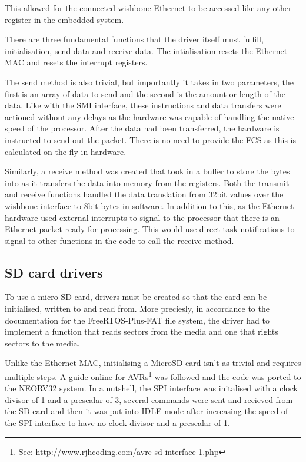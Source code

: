 This allowed for the connected wishbone Ethernet to be accessed like any other register in the embedded system. 


There are three fundamental functions that the driver itself must fulfill, initialisation, send data and receive data. The intialisation resets the Ethernet MAC and resets the interrupt registers. 

The send method is also trivial, but importantly it takes in two parameters, the first is an array of data to send and the second is the amount or length of the data. Like with the SMI interface, these instructions and data transfers were actioned without any delays as the hardware was capable of handling the native speed of the processor. After the data had been transferred, the hardware is instructed to send out the packet. There is no need to provide the FCS as this is calculated on the fly in hardware. 

Similarly, a receive method was created that took in a buffer to store the bytes into as it transfers the data into memory from the registers. Both the transmit and receive functions handled the data translation from 32bit values over the wishbone interface to 8bit bytes in software. In addition to this, as the Ethernet hardware used external interrupts to signal to the processor that there is an Ethernet packet ready for processing. This would use direct task notifications to signal to other functions in the code to call the receive method. 


\subsection{SD card drivers}

To use a micro SD card, drivers must be created so that the card can be initialised, written to and read from. More preciesly, in accordance to the  documentation for the FreeRTOS-Plus-FAT file system, the driver had to implement a function that reads sectors from the media and one that rights sectors to the media. 

Unlike the Ethernet MAC, initialising a MicroSD card isn't as trivial and requires multiple steps. A guide online for AVRs\footnote[1]{See: http://www.rjhcoding.com/avrc-sd-interface-1.php} was followed and the code was ported to the NEORV32 system. In a nutshell, the SPI interface was initalised with a clock divisor of 1 and a prescalar of 3, several commands were sent and recieved from the SD card and then it was put into IDLE mode after increasing the speed of the SPI interface to have no clock divisor and a prescalar of 1.

